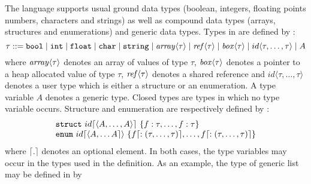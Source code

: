 \documentclass[12pt]{article}
\begin{document}
The \sail{} language supports usual ground data types (boolean, integers, floating points numbers,
characters and strings) as well as compound data types (arrays, structures and enumerations) and generic data types.
Types in \sail{} are defined by :
$$
  \tau ::= {\tt{bool}} \mid {\tt{int}} \mid  {\tt{float}} \mid {\tt{char}} \mid {\tt{string}} \\
  \mid \mathit{array} \langle\tau\rangle \mid \mathit{ref}\langle\tau\rangle \mid \mathit{box} \langle \tau \rangle \mid id\langle \tau,\ldots,\tau\rangle \mid A
$$
where $\mathit{array}\langle\tau\rangle$ denotes an array of values of type $\tau$, $\mathit{box}\langle\tau\rangle$
denotes a pointer to a heap allocated value of type $\tau$, $\mathit{ref}\langle\tau\rangle$ denotes a shared reference and
$id\langle \tau,\ldots,\tau \rangle$ denotes a user type which is either a structure or an enumeration.
A type variable $A$ denotes a generic type. Closed types are types in which no type variable occurs.
Structure and enumeration are respectively defined by :
$$
  \begin{array}{lcl}
    {\tt{struct}}~id\lceil\langle A,\ldots,A \rangle\rceil~\{f:\tau,\ldots,f:\tau\}                                                      \\
    {\tt{enum}}~id\lceil\langle A, \ldots A\rceil\rangle~\{f\lceil :(\tau,\ldots,\tau) \rceil,\ldots,f\lceil :(\tau,\ldots,\tau)\rceil\} \\
  \end{array}
$$
where $\lceil . \rceil$ denotes an optional element.
In both cases, the type variables may occur in the types used in the definition.
As an example, the type of generic list may be defined in \sail{} by
\end{document}
